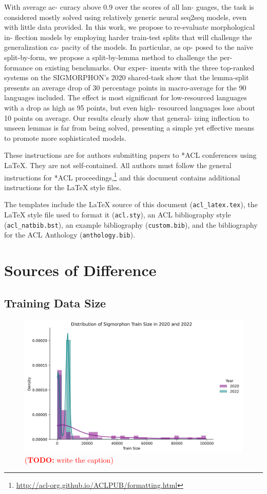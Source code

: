 \documentclass[11pt]{article}
\newcommand{\todo}[1]{\textcolor{red}{(\textbf{TODO:} #1)}}
\begin{document}
With average ac- curacy above 0.9 over the scores of all lan- guages, the task is considered mostly solved using relatively generic neural seq2seq models, even with little data provided. In this work, we propose to re-evaluate morphological in- flection models by employing harder train-test splits that will challenge the generalization ca- pacity of the models. In particular, as op- posed to the naïve split-by-form, we propose a split-by-lemma method to challenge the per- formance on existing benchmarks. Our exper- iments with the three top-ranked systems on the SIGMORPHON’s 2020 shared-task show that the lemma-split presents an average drop of 30 percentage points in macro-average for the 90 languages included. The effect is most significant for low-resourced languages with a drop as high as 95 points, but even high- resourced languages lose about 10 points on average. Our results clearly show that general- izing inflection to unseen lemmas is far from being solved, presenting a simple yet effective means to promote more sophisticated models.





These instructions are for authors submitting papers to *ACL conferences using \LaTeX. They are not self-contained. All authors must follow the general instructions for *ACL proceedings,\footnote{\url{http://acl-org.github.io/ACLPUB/formatting.html}} and this document contains additional instructions for the \LaTeX{} style files.

The templates include the \LaTeX{} source of this document (\texttt{acl\_latex.tex}),
the \LaTeX{} style file used to format it (\texttt{acl.sty}),
an ACL bibliography style (\texttt{acl\_natbib.bst}),
an example bibliography (\texttt{custom.bib}),
and the bibliography for the ACL Anthology (\texttt{anthology.bib}).


\newpage
\section{Sources of Difference}




\subsection{Training Data Size}

\begin{figure}[h!]
\centering
\includegraphics[width=0.8\linewidth]{figs/training_size.png}
\caption{\todo{write the caption}}
\label{fig:training_size}
\end{figure}
\end{document}
